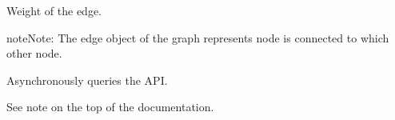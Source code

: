 \documentclass[letterpaper,10pt,english,openany,oneside]{sphinxmanual}
\begin{document}
\begin{fulllineitems}
\begin{fulllineitems}
\begin{fulllineitems}
\begin{fulllineitems}
\begin{fulllineitems}
\begin{sphinxVerbatim}[commandchars=\\\{\}]
 
\end{sphinxVerbatim}

\end{fulllineitems}


\begin{fulllineitems}
\label{\detokenize{source/wrapper/graph:instahashtag.wrapper.graph.Graph.GraphEdge.weight}}
Weight of the edge.

\begin{sphinxVerbatim}[commandchars=\\\{\}]
 
\end{sphinxVerbatim}

\end{fulllineitems}


\begin{sphinxadmonition}{note}{Note:}
The edge object of the graph represents  node is connected to which other node.
\end{sphinxadmonition}

\end{fulllineitems}


\end{fulllineitems}


\end{fulllineitems}


\begin{fulllineitems}
\label{\detokenize{source/wrapper/graph:instahashtag.wrapper.Graph.Graph.call}}
Asynchronously queries the API.

See note on the top of the {\hyperref[\detokenize{source/wrapper:wrapper}]{}} documentation.

\end{fulllineitems}


\end{fulllineitems}
\end{document}
